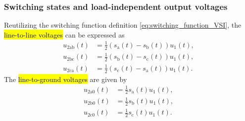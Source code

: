 \begin{frame}
	\frametitle{Switching states and load-independent output voltages}
	Reutilizing the switching function definition \eqref{eq:switching_function_VSI}, the \hl{line-to-line voltages} can be expressed as
	\begin{equation}
		\begin{split}
			u_{2\mathrm{ab}}(t) & = \frac{1}{2}\left(s_{\mathrm{a}}(t)-s_{\mathrm{b}}(t)\right)u_1(t), \\
			u_{2\mathrm{bc}}(t) & = \frac{1}{2}\left(s_{\mathrm{b}}(t)-s_{\mathrm{c}}(t)\right)u_1(t), \\
			u_{2\mathrm{ca}}(t) & = \frac{1}{2}\left(s_{\mathrm{c}}(t)-s_{\mathrm{a}}(t)\right)u_1(t).
		\end{split}
	\end{equation}\pause
	The \hl{line-to-ground voltages} are given by
	\begin{equation}
		\begin{split}
			u_{2\mathrm{a}0}(t) & = \frac{1}{2}s_{\mathrm{a}}(t)u_1(t), \\
			u_{2\mathrm{b}0}(t) & = \frac{1}{2}s_{\mathrm{b}}(t)u_1(t), \\
			u_{2\mathrm{c}0}(t) & = \frac{1}{2}s_{\mathrm{c}}(t)u_1(t).
		\end{split}
	\end{equation}
\end{frame}

